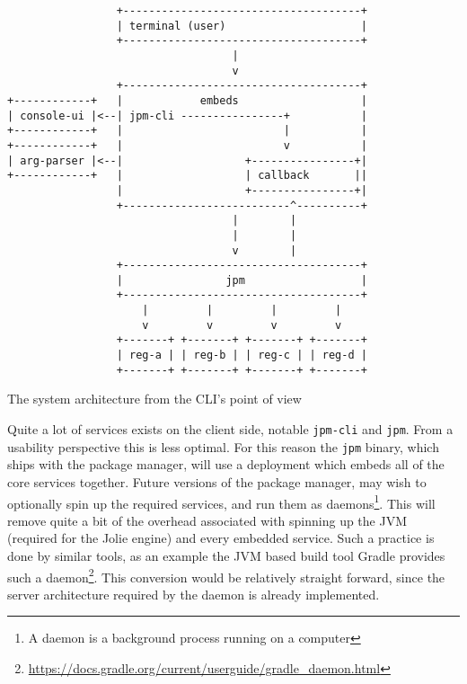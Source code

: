 \begin{listing}[H]
\begin{verbatim}
                 +-------------------------------------+
                 | terminal (user)                     |
                 +-------------------------------------+
                                   |
                                   v
                 +-------------------------------------+
+------------+   |            embeds                   |
| console-ui |<--| jpm-cli ----------------+           |
+------------+   |                         |           |
+------------+   |                         v           |
| arg-parser |<--|                   +----------------+|
+------------+   |                   | callback       ||
                 |                   +----------------+|
                 +--------------------------^----------+
                                   |        |
                                   |        |
                                   v        |
                 +-------------------------------------+
                 |                jpm                  |
                 +-------------------------------------+
                     |         |         |         |
                     v         v         v         v
                 +-------+ +-------+ +-------+ +-------+
                 | reg-a | | reg-b | | reg-c | | reg-d |
                 +-------+ +-------+ +-------+ +-------+
\end{verbatim}
\caption{The system architecture from the CLI's point of view}
\label{fig:cli_arch}
\end{listing}

Quite a lot of services exists on the client side, notable
\texttt{jpm-cli} and \texttt{jpm}. From a usability
perspective this is less optimal. For this reason the \texttt{jpm}
binary, which ships with the package manager, will use a deployment which
embeds all of the core services together. Future versions of the package
manager, may wish to optionally spin up the required services, and run them as
daemons\footnote{A daemon is a background process running on a computer}. This
will remove quite a bit of the overhead associated with spinning up the JVM
(required for the Jolie engine) and every embedded service. Such a practice is
done by similar tools, as an example the JVM based build tool Gradle provides
such a
daemon\footnote{\url{https://docs.gradle.org/current/userguide/gradle_daemon.html}}.
This conversion would be relatively straight forward, since the server
architecture required by the daemon is already implemented.
